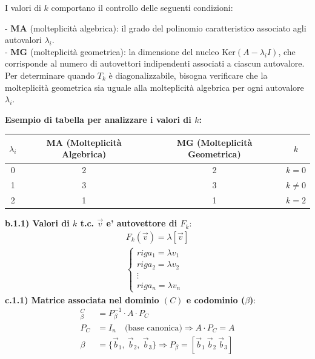 \documentclass[a4paper,12pt]{article}
\begin{document}
I valori di \( k \) comportano il controllo delle seguenti condizioni:

- \textbf{MA} (molteplicità algebrica): il grado del polinomio caratteristico associato agli autovalori \( \lambda_i \). \\
- \textbf{MG} (molteplicità geometrica): la dimensione del nucleo \( \text{Ker}(A - \lambda_i I) \), che corrisponde al numero di autovettori indipendenti associati a ciascun autovalore. \\

Per determinare quando \( T_k \) è diagonalizzabile, bisogna verificare che la molteplicità geometrica sia uguale alla molteplicità algebrica per ogni autovalore \( \lambda_i \).

\textbf{Esempio di tabella per analizzare i valori di \( k \):}

\begin{tabular}{|c|c|c|c|}
    \hline
    \( \lambda_i \) & MA (Molteplicità Algebrica) & MG (Molteplicità Geometrica) & \( k \) \\
    \hline
    0 & 2 & 2 & \( k=0 \) \\
    \hline
    1 & 3 & 3 & \( k \neq 0 \) \\
    \hline
    2 & 1 & 1 & \( k=2 \) \\
    \hline
\end{tabular}
\vspace{1em}

\textbf{b.1.1) Valori di $k$ t.c. $\vec{v}$ e' autovettore di $F_k$}:
\begin{align}
    F_k(\vec{v})=\lambda[\vec{v}] \\
    \begin{cases}
        riga_1=\lambda v_1 \\
        riga_2=\lambda v_2\\
        \vdots \\
        riga_n=\lambda v_n
    \end{cases}
\end{align}
\textbf{c.1.1) Matrice associata nel dominio $(C)$ e codominio ($\beta$)}: 
\begin{align}
    [M]_{\beta}^{C} &= P_{\beta}^{-1} \cdot A \cdot P_C \\
    P_C &= I_n \quad \text{(base canonica)} \Rightarrow A \cdot P_C = A \\
    \beta &= \{ \vec{b}_1,\ \vec{b}_2,\ \vec{b}_3 \} \Rightarrow P_{\beta} = [\vec{b}_1\ \vec{b}_2\ \vec{b}_3]
\end{align}
\end{document}
